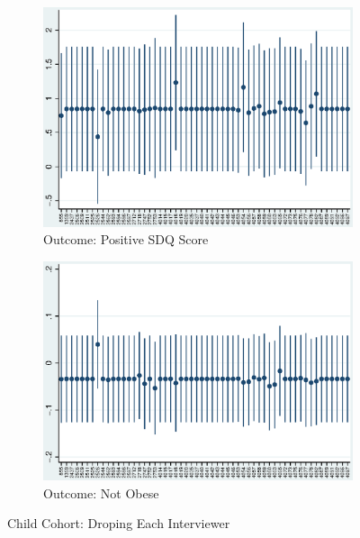     \begin{figure}[H]
      \centering
        \begin{subfigure}[t]{0.81\textwidth}
          \includegraphics[width=\textwidth]{../../../output/image/coef-interviewer-child-pos_childSDQ_score.eps}       
\caption{Outcome: Positive SDQ Score}        
        \end{subfigure}
        \begin{subfigure}[t]{0.81\textwidth}
          \includegraphics[width=\textwidth]{../../../output/image/coef-interviewer-child-BMI_obese.eps}       
 \caption{Outcome: Not Obese}        
        \end{subfigure}
      \caption{Child Cohort: Droping Each Interviewer}  \label{fig:child-sensitivity-interviewer}
    \end{figure}

